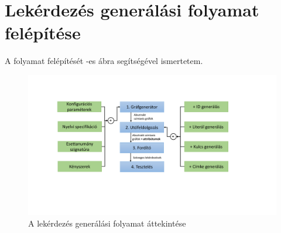   

\section{Lekérdezés generálási folyamat felépítése}


A folyamat felépítését  -es ábra segítségével ismertetem.  

\begin{figure}
	\centering
	\includegraphics[width=1.0\textwidth]{figures/blokkdiagramAttekintes}
	\caption{A lekérdezés generálási folyamat áttekintése}
	\label{fig:blokkdiagramAttekintes}
\end{figure}
